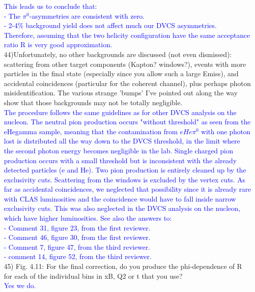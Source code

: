 \textcolor{blue}{This leads us to conclude that:\\
- The  $\pi^{0}$-asymmetries are consistent with zero.\\
- 2-4$\%$ background yield does not affect much our DVCS asymmetries.\\
Therefore, assuming that the two helicity configuration have the same 
acceptance ratio R is very good approximation.}\\
 
44)Unfortunately, no other backgrounds are discussed (not even dismissed): 
scattering from other target components (Kapton? windows?), events with more 
particles in the final state (especially since you allow such a large Emiss), 
and accidental coincidences (particular for the coherent channel), plus perhaps 
photon misidentification. The various strange 'bumps' I've pointed out along 
the way show that those backgrounds may not be totally negligible. \\
\textcolor{blue}{The procedure follows the same guidelines as for other DVCS 
analysis on the nucleon. The neutral pion production occurs "without threshold" 
as seen from the eHegamma sample, meaning that the contamination from 
$eHe\pi^0$ with one photon lost is distributed all the way down to the DVCS 
threshold, in the limit where the second photon energy becomes negligible in 
the lab. Single charged pion production occurs with a small threshold but is 
inconsistent with the already detected particles (e and He). Two pion 
production is entirely cleaned up by the exclusivity cuts. Scattering from the 
windows is excluded by the vertex cuts. As far as accidental coincidences, we 
neglected that possibility since it is already rare with CLAS luminosities and 
the coincidence would have to fall inside narrow exclusivity cuts. This was 
also neglected in the DVCS analysis on the nucleon, which have higher 
luminosities. See also the answers to:\\
- Comment 31, figure 23, from the first reviewer.\\
- Comment 46, figure 30, from the first reviewer.\\
- Comment 7, figure 47, from the third reviewer.\\
- comment 14, figure 52, from the third reviewer.}\\


45) Fig. 4.11: For the final correction, do you produce the phi-dependence of R 
for each of the individual bins in xB, Q2 or t that you use? \\
 \textcolor{blue}{Yes we do.}\\

